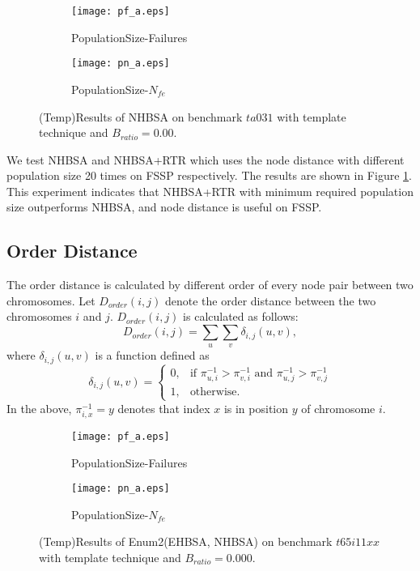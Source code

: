 \begin{figure}[htbp] 
        \centering
        \begin{subfigure}{0.49\textwidth}
            \texttt{[image: pf\_a.eps]}
            \caption{PopulationSize-Failures} 
        \end{subfigure}
        \begin{subfigure}{0.49\textwidth} 
            \texttt{[image: pn\_a.eps]}
            \caption{PopulationSize-$N_{fe}$}
        \end{subfigure}

        \caption{(Temp)Results of NHBSA on benchmark $ta031$ with template technique and $B_{ratio}=0.00$.  } 
        \label{fig:nhbsa_pf}
\end{figure}

We test NHBSA and NHBSA+RTR which uses the node distance with different population size 20 times on FSSP respectively. The results are shown in Figure \ref{fig:nhbsa_pf}. This experiment indicates that NHBSA+RTR with minimum required population size outperforms NHBSA, and node distance is useful on FSSP.



\subsection{Order Distance}
The order distance is calculated by different order of every node pair between two chromosomes. Let $D_{order} (i,j)$ denote the order distance between the two chromosomes $i$ and $j$. $D_{order} (i,j)$ is calculated as follows:\[D_{order} (i,j)=\sum_u \sum_v \delta_{i,j}(u,v),\]
where $\delta_{i,j} (u,v)$ is a function defined as \[\delta_{i,j} (u,v)=
\begin{cases}
0,  & \mbox{if }\pi_{u,i}^{-1}>\pi_{v,i}^{-1}\mbox{ and } \pi_{u,j}^{-1}>\pi_{v,j}^{-1}  \\
1, & \mbox{otherwise.}
\end{cases}
\]
In the above, $\pi_{i,x}^{-1}=y$ denotes that index $x$ is in position $y$ of chromosome $i$.



\begin{figure}[htbp] 
        \centering
        \begin{subfigure}{0.49\textwidth}
            \texttt{[image: pf\_a.eps]}
            \caption{PopulationSize-Failures} 
        \end{subfigure}
        \begin{subfigure}{0.49\textwidth} 
            \texttt{[image: pn\_a.eps]}
            \caption{PopulationSize-$N_{fe}$}
        \end{subfigure}

        \caption{(Temp)Results of Enum2(EHBSA, NHBSA) on benchmark $t65i11xx$ with template technique and $B_{ratio}=0.000$.  } 
        \label{fig:order_pf}
\end{figure}


